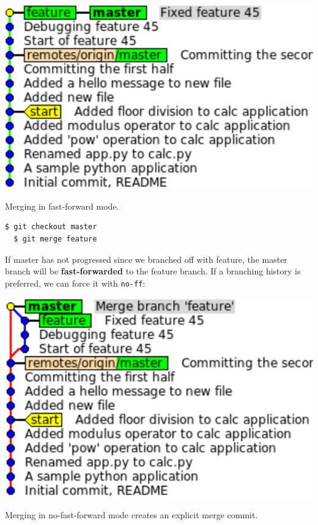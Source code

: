 \documentclass{tufte-handout}
\begin{document}
\begin{marginfigure}%
  \centering
  \includegraphics[width=\linewidth]{gitmerge-ff.pdf}
  \label{fig:gitmerge-ff}
  \caption{Merging in fast-forward mode.}
\end{marginfigure}

\begin{lstlisting}[style=BashInputStyle]
  $ git checkout master
  $ git merge feature
\end{lstlisting}

If master has not progressed since we branched off with feature, the master branch will be \textbf{fast-forwarded} to the feature branch.
If a branching history is preferred, we can force it with \texttt{no-ff}:

\begin{marginfigure}%
  \centering
  \includegraphics[width=\linewidth]{gitmerge-noff.pdf}
  \label{fig:gitmerge-noff}
  \caption{Merging in no-fast-forward mode creates an explicit merge commit.}
\end{marginfigure}
\end{document}
